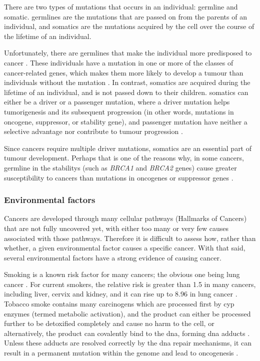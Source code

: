 There are two types of mutations that occurs in an individual: \gls{germline} and \gls{somatic}.
\Glspl{germline} are the mutations that are passed on from the parents of an individual, and \glspl{somatic} are the mutations acquired by the cell over the course of the lifetime of an individual.

Unfortunately, there are \glspl{germline} that make the individual more predisposed to cancer \citep{Vogelstein2004a}.
These individuals have a mutation in one or more of the classes of cancer-related genes, which makes them more likely to develop a tumour than individuals without the mutation \citep{Vogelstein2004a}.
In contrast, \glspl{somatic} are acquired during the lifetime of an individual, and is not passed down to their children.
\Glspl{somatic} can either be a \gls{driver} or a \gls{passenger} mutation, where a \gls{driver} mutation helps tumorigenesis and its subsequent progression (in other words, mutations in \gls{oncogene}, \gls{suppressor}, or stability gene), and \gls{passenger} mutation have neither a selective advantage nor contribute to tumour progression \citep{Stratton2009}.

Since cancers require multiple \gls{driver} mutations, \glspl{somatic} are an essential part of tumour development.
Perhaps that is one of the reasons why, in some cancers, \gls{germline} in the \glspl{stability} (such as \textit{BRCA1} and \textit{BRCA2} genes) cause greater susceptibility to cancers than mutations in \glspl{oncogene} or \gls{suppressor} genes \citep{Vogelstein2004a}.

\subsubsection{Environmental factors}
\label{ssub:environmental_factors}

Cancers are developed through many cellular pathways (Hallmarks of Cancers) that are not fully uncovered yet, with either too many or very few causes associated with those pathways.
Therefore it is difficult to assess how, rather than whether, a given environmental factor causes a specific cancer.
With that said, several environmental factors have a strong evidence of causing cancer.

Smoking is a known risk factor for many cancers; the obvious one being lung cancer \citep{Gandini2008,Hecht1999}.
For current smokers, the relative risk is greater than 1.5 in many cancers, including liver, cervix and kidney, and it can rise up to 8.96 in lung cancer \citep{Gandini2008}.
Tobacco smoke contains many \glspl{carcinogen} which are processed first by \gls{cyp} enzymes (termed meta\-bolic activation), and the product can either be processed further to be detoxified completely and cause no harm to the cell, or alternatively, the product can covalently bind to the \acrshort{dna}, forming \acrshort{dna} adducts \citep{Hecht1999}.
Unless these adducts are resolved correctly by the \acrshort{dna} repair mechanisms, it can result in a permanent mutation within the genome and lead to oncogenesis \citep{Hecht1999}.

